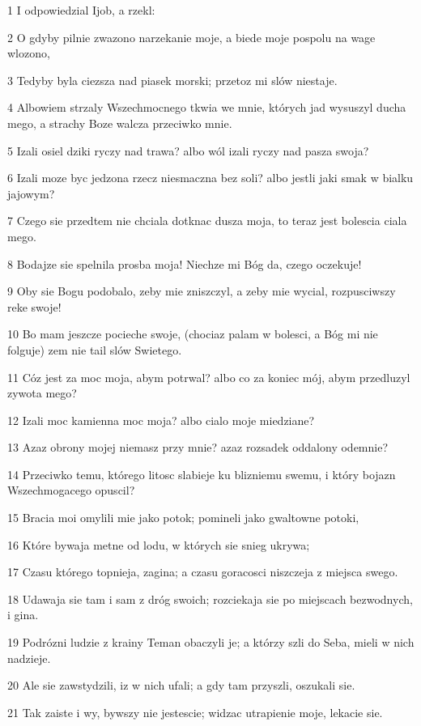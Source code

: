 \par 1 I odpowiedzial Ijob, a rzekl:
\par 2 O gdyby pilnie zwazono narzekanie moje, a biede moje pospolu na wage wlozono,
\par 3 Tedyby byla ciezsza nad piasek morski; przetoz mi slów niestaje.
\par 4 Albowiem strzaly Wszechmocnego tkwia we mnie, których jad wysuszyl ducha mego, a strachy Boze walcza przeciwko mnie.
\par 5 Izali osiel dziki ryczy nad trawa? albo wól izali ryczy nad pasza swoja?
\par 6 Izali moze byc jedzona rzecz niesmaczna bez soli? albo jestli jaki smak w bialku jajowym?
\par 7 Czego sie przedtem nie chciala dotknac dusza moja, to teraz jest bolescia ciala mego.
\par 8 Bodajze sie spelnila prosba moja! Niechze mi Bóg da, czego oczekuje!
\par 9 Oby sie Bogu podobalo, zeby mie zniszczyl, a zeby mie wycial, rozpusciwszy reke swoje!
\par 10 Bo mam jeszcze pocieche swoje, (chociaz palam w bolesci, a Bóg mi nie folguje) zem nie tail slów Swietego.
\par 11 Cóz jest za moc moja, abym potrwal? albo co za koniec mój, abym przedluzyl zywota mego?
\par 12 Izali moc kamienna moc moja? albo cialo moje miedziane?
\par 13 Azaz obrony mojej niemasz przy mnie? azaz rozsadek oddalony odemnie?
\par 14 Przeciwko temu, którego litosc slabieje ku blizniemu swemu, i który bojazn Wszechmogacego opuscil?
\par 15 Bracia moi omylili mie jako potok; pomineli jako gwaltowne potoki,
\par 16 Które bywaja metne od lodu, w których sie snieg ukrywa;
\par 17 Czasu którego topnieja, zagina; a czasu goracosci niszczeja z miejsca swego.
\par 18 Udawaja sie tam i sam z dróg swoich; rozciekaja sie po miejscach bezwodnych, i gina.
\par 19 Podrózni ludzie z krainy Teman obaczyli je; a którzy szli do Seba, mieli w nich nadzieje.
\par 20 Ale sie zawstydzili, iz w nich ufali; a gdy tam przyszli, oszukali sie.
\par 21 Tak zaiste i wy, bywszy nie jestescie; widzac utrapienie moje, lekacie sie.
